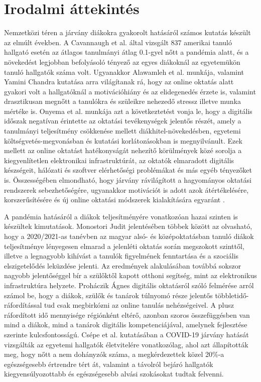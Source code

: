 \documentclass[12pt]{article}
\begin{document}
\newpage

\section{Irodalmi áttekintés}

Nemzetközi téren a járvány diákokra gyakorolt hatásáról számos kutatás készült az elmúlt években. A Cavannaugh et al. \cite{student_perf1} által vizsgált 837 amerikai tanuló hallgató esetén az átlagos tanulmányi átlag 0.1-gyel nőtt a pandémia alatt, és a növekedést legjobban befolyásoló tényező az egyes diákoknál az egyetemükön tanuló hallgatók száma volt. Ugyanakkor Alawamleh et al. \cite{student_perf8} munkája, valamint Yamini Chandra \cite{student_perf6} kutatása arra világítanak rá, hogy az online oktatás alatt gyakori volt a hallgatóknál a motivációhiány és az elidegenedés érzete is, valamint drasztikusan megnőtt a tanulókra és szüleikre nehezedő stressz illetve munka mértéke is.
Onyema et al. \cite{student_perf5} munkája azt a következtetést vonja le, hogy a digitális időszak negatívan érintette az oktatási tevékenységek jelentős részét, amely a tanulmányi teljesítmény csökkenése mellett diákhitel-növekedésben, egyetemi költségvetés-megvonásban és kutatási korlátozásokban is megnyilvánult. Ezek mellett az online oktatást hatékonyságát nehezítő körülmények közé sorolja a kiegyenlítetlen elektronikai infrastruktúrát, az oktatók elmaradott digitális készségeit, hálózati és szoftver elérhetőségi problémákat és más egyéb tényezőket is.
Összességében elmondható, hogy járvány rávilágított a hagyományos oktatási rendszerek sebezhetőségére, ugyanakkor motivációt is adott azok átértékelésére, korszerűsítésére és új online oktatási módszerek kialakítására egyaránt \cite{student_perf7, student_perf9}. 

A pandémia hatásáról a diákok teljesítményére vonatkozóan hazai szinten is készültek kimutatások. Monostori Judit \cite{magyar1} jelentésében többek között az olvasható, hogy a 2020/2021-as tanévben az magyar alsó- és középoktatásban tanuló diákok teljesítménye lényegesen elmarad a jelenléti oktatás során megszokott szinttől, illetve a legnagyobb kihívást a tanulók figyelmének fenntartása és a szociális elszigetelődés leküzdése jelenti. Az eredmények alakulásában továbbá sokszor nagyobb jelentőséggel bír a szülőktől kapott otthoni segítség, mint az elektronikus infrastruktúra helyzete.
Proháczik Ágnes \cite{magyar2} digitális oktatásról szóló felmérése arról számol be, hogy  a diákok, szülők és tanárok túlnyomó része jelentős többletidő-ráfordítással tud csak megbirkózni az online tanulás nehézségeivel. A plusz ráfordított idő mennyisége régiónként eltérő, azonban szoros összefüggésben van mind a diákok, mind a tanárok digitális kompetenciájával, amelynek fejlesztése szerinte kulcsfontosságú. 
Csépe et al. \cite{magyar3} kutatásában a COVID-19 járvány hatását vizsgálták az egyetemi hallgatók életvitelére vonatkozólag, ahol azt állapították meg, hogy nőtt a nem dohányzók száma, a megkérdezettek közel 20\%-a egészségesebb értrendre tért át, valamint a távolról bejáró hallgatók kiegyensúlyozottabb és egészségesebb alvási szokásokat tudtak felvenni.
\end{document}
